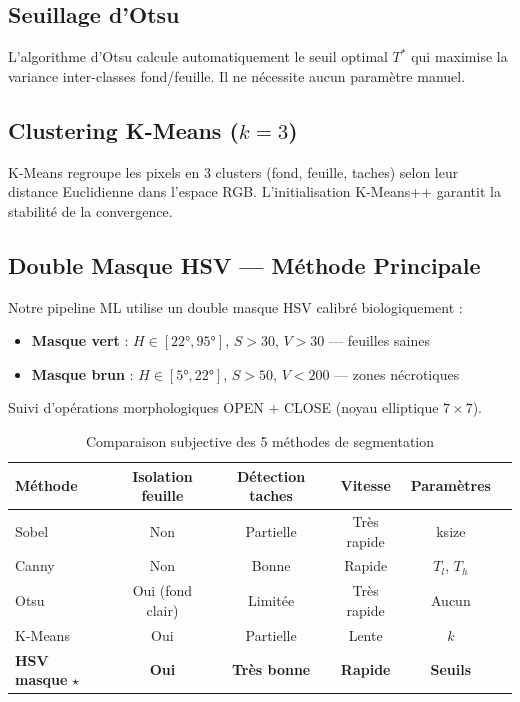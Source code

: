 \documentclass[12pt,a4paper]{article}
\begin{document}
\subsection{Seuillage d'Otsu}
L'algorithme d'Otsu calcule automatiquement le seuil optimal $T^*$ qui maximise 
la variance inter-classes fond/feuille. Il ne nécessite aucun paramètre manuel.

\subsection{Clustering K-Means ($k=3$)}
K-Means regroupe les pixels en 3 clusters (fond, feuille, taches) selon leur 
distance Euclidienne dans l'espace RGB. L'initialisation K-Means++ garantit 
la stabilité de la convergence.

\subsection{Double Masque HSV — Méthode Principale}
Notre pipeline ML utilise un double masque HSV calibré biologiquement :
\begin{itemize}
  \item \textbf{Masque vert} : $H \in [22°, 95°]$, $S > 30$, $V > 30$ — feuilles saines
  \item \textbf{Masque brun} : $H \in [5°, 22°]$, $S > 50$, $V < 200$ — zones nécrotiques
\end{itemize}
Suivi d'opérations morphologiques OPEN + CLOSE (noyau elliptique $7\times7$).

\begin{table}[H]
\centering\small
\begin{tabular}{lccccc}
\toprule
\textbf{Méthode} & \textbf{Isolation feuille} & \textbf{Détection taches} & \textbf{Vitesse} & \textbf{Paramètres} \\
\midrule
Sobel & Non & Partielle & Très rapide & ksize \\
Canny & Non & Bonne & Rapide & $T_l$, $T_h$ \\
Otsu & Oui (fond clair) & Limitée & Très rapide & Aucun \\
K-Means & Oui & Partielle & Lente & $k$ \\
\textbf{HSV masque} $\star$ & \textbf{Oui} & \textbf{Très bonne} & \textbf{Rapide} & \textbf{Seuils} \\
\bottomrule
\end{tabular}
\caption{Comparaison subjective des 5 méthodes de segmentation}
\end{table}
\end{document}
